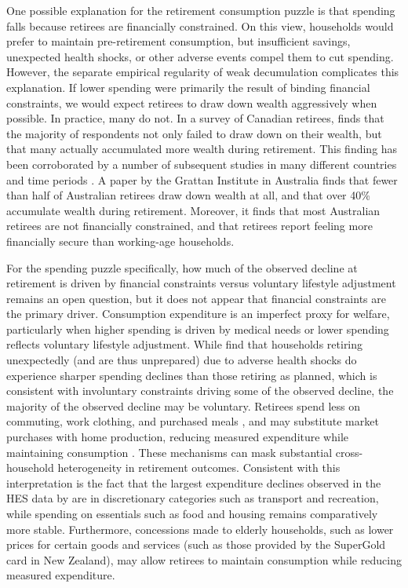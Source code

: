 \documentclass[11pt]{article}
\begin{document}
One possible explanation for the retirement consumption puzzle is that spending falls because retirees are financially constrained. On this view, households would prefer to maintain pre-retirement consumption, but insufficient savings, unexpected health shocks, or other adverse events compel them to cut spending. However, the separate empirical regularity of weak decumulation complicates this explanation. If lower spending were primarily the result of binding financial constraints, we would expect retirees to draw down wealth aggressively when possible. In practice, many do not. In a survey of Canadian retirees, \textcite{king1982asset} finds that the majority of respondents not only failed to draw down on their wealth, but that many actually accumulated more wealth during retirement. This finding has been corroborated by a number of subsequent studies in many different countries and time periods \parencite[e.g.][]{LOVE2009191, palumbo1999uncertain, denardi2010differential}. A paper by the Grattan Institute in Australia \parencite{grattan2019savingsBehaviourOlderHouseholds} finds that fewer than half of Australian retirees draw down wealth at all, and that over 40\% accumulate wealth during retirement. Moreover, it finds that most Australian retirees are not financially constrained, and that retirees report feeling more financially secure than working-age households.

For the spending puzzle specifically, how much of the observed decline at retirement is driven by financial constraints versus voluntary lifestyle adjustment remains an open question, but it does not appear that financial constraints are the primary driver. Consumption expenditure is an imperfect proxy for welfare, particularly when higher spending is driven by medical needs or lower spending reflects voluntary lifestyle adjustment. While \textcite{barrett2010involuntary} find that households retiring unexpectedly (and are thus unprepared) due to adverse health shocks do experience sharper spending declines than those retiring as planned, which is consistent with involuntary constraints driving some of the observed decline, the majority of the observed decline may be voluntary. Retirees spend less on commuting, work clothing, and purchased meals \parencite{aguiar2008deconstructing, battistin2007retirementPuzzle}, and may substitute market purchases with home production, reducing measured expenditure while maintaining consumption \parencite{becker1965allocation, hurd2003retirementPuzzle}. These mechanisms can mask substantial cross-household heterogeneity in retirement outcomes. Consistent with this interpretation is the fact that the largest expenditure declines observed in the HES data by \textcite{le2023expenditure} are in discretionary categories such as transport and recreation, while spending on essentials such as food and housing remains comparatively more stable. Furthermore, concessions made to elderly households, such as lower prices for certain goods and services (such as those provided by the SuperGold card in New Zealand), may allow retirees to maintain consumption while reducing measured expenditure.
\end{document}
